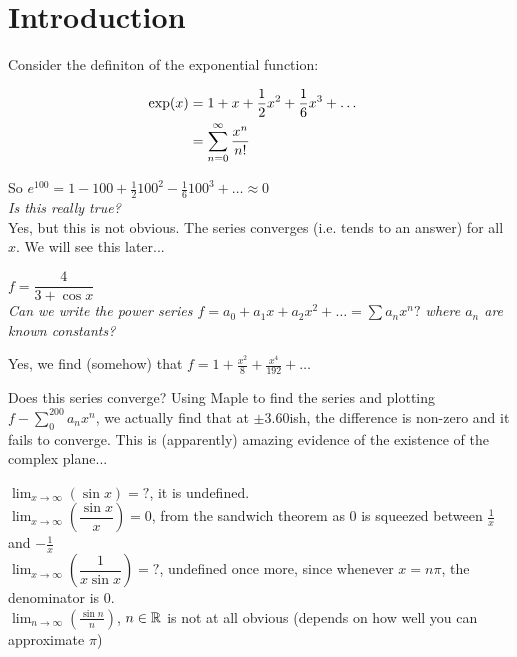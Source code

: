 \documentclass[10pt]{scrartcl}
\begin{document}
\pagebreak
\setcounter{page}{3}
\section{Introduction}



\begin{example}
Consider the definiton of the exponential function: \vspace{-10pt}

\begin{align} \nonumber
\exp(x) &= 1 + x + \frac{1}{2}x^2 + \frac{1}{6}x^3 + \dots && \vspace*{5pt}\\\nonumber
&= \sum_{n=0}^{\infty} \frac{x^n}{n!} &&
\end{align}

So $e^{100} = 1 - 100 + \frac{1}{2}100^2 - \frac{1}{6}100^3 + \dots \approx 0$\\

\textit{Is this really true?}\\
Yes, but this is not obvious. The series converges (i.e. tends to an answer) for all $x$. We will see this later...
\end{example}\vspace*{5pt}

\begin{example}
$f = \dfrac{4}{3+\cos x}$\\

\emph{Can we write the power series $f = a_0 + a_1 x + a_2 x^2 + \dots = \sum a_n x^n?$ where $a_n$ are known constants?}

Yes, we find (somehow) that $f = 1 + \frac{x^2}{8} + \frac{x^4}{192} + \dots$

Does this series converge? Using Maple to find the series and plotting $f - \sum_0^{200} a_n x^n$, we actually find that at $\pm 3.60$ish, the difference is non-zero and it fails to converge. This is (apparently) amazing evidence of the existence of the complex plane...
\end{example}\vspace*{5pt}

\begin{example}[Limits]

$\displaystyle{\lim_{x \to \infty} (\sin x) = ? }$, it is undefined.\\

$\displaystyle{\lim_{x \to \infty} \left(\dfrac{\sin x}{x}\right) }= 0 $, from the sandwich theorem as 0 is squeezed between $\frac{1}{x}$ and $-\frac{1}{x}$\\

$\displaystyle{\lim_{x \to \infty} \left(\dfrac{1}{x\sin x}\right) = ? }$, undefined once more, since whenever $x = n\pi$, the denominator is 0.\\

$\displaystyle{\lim_{n \to \infty} \left(\frac{\sin n}{n}\right) }$, $n \in \mathbb{R}$ is not at all obvious (depends on how well you can approximate $\pi$)
\end{example}
\end{document}
